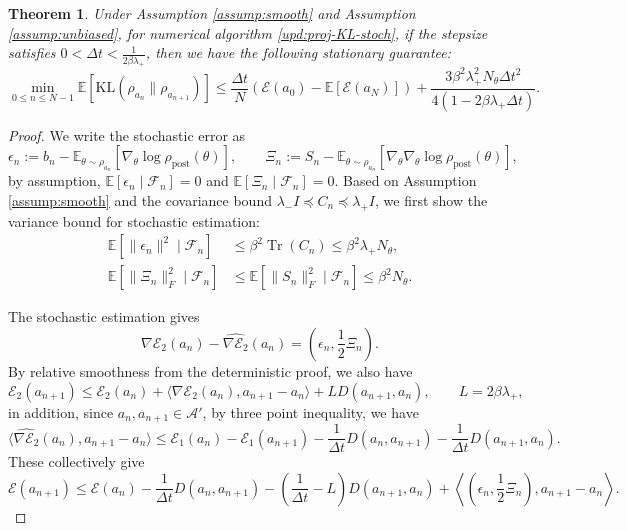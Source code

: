 \documentclass[11pt]{article}
\theoremstyle{plain}
\newtheorem{theorem}{Theorem}[section]
\theoremstyle{definition}
\theoremstyle{remark}
\newcommand{\E}{\mathbb{E}}
\newcommand{\KL}{\mathrm{KL}}
\newcommand{\Tr}{\operatorname{Tr}}
\newcommand{\post}{\mathrm{post}}
\newcommand{\Aspace}{\mathcal{A}}
\begin{document}
\begin{theorem}
    Under Assumption \ref{assump:smooth} and Assumption \ref{assump:unbiased}, for numerical algorithm \eqref{upd:proj-KL-stoch}, if the stepsize satisfies $0 < \Delta t < \frac{1}{2 \beta \lambda_+}$, then we have the following stationary guarantee:
    \begin{equation*}
        \min_{0 \leq n \leq N - 1} \E[\KL (\rho_{a_n} \| \rho_{a_{n+1}})] \le \frac{\Delta t}{N} (\mathcal{E} (a_0) - \E [\mathcal{E} (a_N)] ) + \frac{3 \beta^2 \lambda_+^2 N_\theta \Delta t^2}{4 (1 - 2\beta \lambda_+ \Delta t)}.
    \end{equation*}
\end{theorem}

\begin{proof}
    We write the stochastic error as
    \begin{equation*}
        \epsilon_n := b_n - \E_{\theta\sim \rho_{a_n}} [\nabla_\theta \log \rho_\post (\theta)], \qquad \Xi_n := S_n -  \E_{\theta\sim \rho_{a_n}} [\nabla_\theta \nabla_\theta \log \rho_\post (\theta)],
    \end{equation*}
    by assumption, $\E[\epsilon_n \mid \mathcal{F}_n] = 0$ and $\E[\Xi_n \mid \mathcal{F}_n] = 0$. Based on Assumption \ref{assump:smooth} and the covariance bound $\lambda_- I \preceq C_n \preceq \lambda_+ I$, we first show the variance bound for stochastic estimation:
    \begin{align*}
        \E[ \|\epsilon_n\|^2 \mid \mathcal{F}_n] &\leq \beta^2 \Tr (C_n) \leq \beta^2 \lambda_+ N_\theta, \\
        \E[ \|\Xi_n\|_F^2 \mid \mathcal{F}_n] &\leq \E [\|S_n\|_F^2 \mid \mathcal{F}_n] \leq \beta^2 N_\theta.
    \end{align*}

    The stochastic estimation gives
    \begin{equation*}
        \nabla \mathcal{E}_2 (a_n) - \widehat{\nabla \mathcal{E}_2} (a_n) = \left( \epsilon_n, \frac{1}{2} \Xi_n \right).
    \end{equation*}
    By relative smoothness from the deterministic proof, we also have
    \begin{equation*}
        \mathcal{E}_2(a_{n+1}) \leq \mathcal{E}_2 (a_n) + \langle \nabla \mathcal{E}_2 (a_n), a_{n+1} - a_n \rangle + L D (a_{n+1}, a_n), \qquad L = 2\beta \lambda_+,
    \end{equation*}
    in addition, since $a_n, a_{n+1} \in \Aspace'$, by three point inequality, we have
    \begin{equation*}
        \langle \widehat{\nabla \mathcal{E}_2} (a_n), a_{n+1} - a_n \rangle \leq \mathcal{E}_1 (a_n) - \mathcal{E}_1 (a_{n+1}) - \frac{1}{\Delta t} D (a_n, a_{n+1}) - \frac{1}{\Delta t} D (a_{n+1}, a_n).
    \end{equation*}
    These collectively give
    \begin{equation*}
        \mathcal{E} (a_{n+1}) \leq \mathcal{E} (a_n) - \frac{1}{\Delta t} D(a_n, a_{n+1}) - \left( \frac{1}{\Delta t} - L \right) D (a_{n+1}, a_n) + \left\langle \left( \epsilon_n, \frac{1}{2} \Xi_n \right), a_{n+1} - a_n \right\rangle.
    \end{equation*}


\end{proof}
\end{document}
